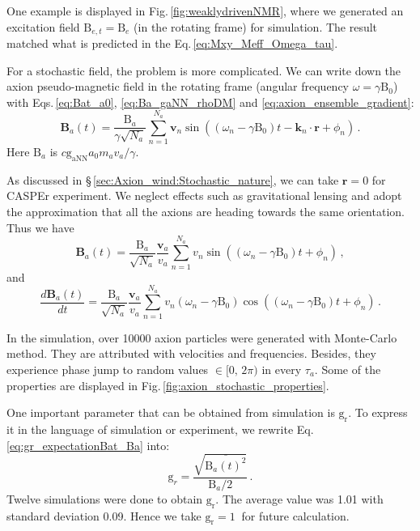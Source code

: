 One example is displayed in Fig.\,\ref{fig:weaklydrivenNMR}, where we generated an excitation field $\mathrm{B}_{e,t} = \mathrm{B}_{e}$ (in the rotating frame) for simulation. The result matched what is predicted in the Eq.\,\eqref{eq:Mxy_Meff_Omega_tau}. 

For a stochastic field, the problem is more complicated. 
We can write down the axion pseudo-magnetic field in the rotating frame (angular frequency $\omega = \gamma \mathrm{B}_0$) with Eqs.\,\eqref{eq:Bat_a0}, \eqref{eq:Ba_gaNN_rhoDM} and \eqref{eq:axion_ensemble_gradient}:
\begin{equation}
    \mathbf{B}_{a}(t) =  \dfrac{ \mathrm{B}_a}{\gamma \sqrt{N_a} }\sum_{n=1}^{N_a} \mathbf{v}_n \sin((\omega_n-\gamma \mathrm{B}_0) t - \mathbf{k}_n\cdot \mathbf{r} + \phi_n)\,. %
\end{equation}
Here $\mathrm{B}_a$ is $c \mathrm{g_{aNN}} a_0 m_a v_a / \gamma$. 

As discussed in \S\,\ref{sec:Axion_wind:Stochastic_nature}, we can take $\mathbf{r} = 0$ for CASPEr experiment. We neglect effects such as gravitational lensing and adopt the approximation that all the axions are heading towards the same orientation. Thus we have
\begin{equation}
    \mathbf{B}_{a}(t) =  \dfrac{ \mathrm{B}_a }{\sqrt{N_a} } \dfrac{\mathbf{v}_a}{v_a} 
    \sum_{n=1}^{N_a}  v_n \sin((\omega_n-\gamma \mathrm{B}_0) t +\phi_n)
    \,,%
\end{equation}
and
\begin{equation}
    \dfrac{d \mathbf{B}_{a}(t)}{dt} =  \dfrac{ \mathrm{B}_a }{\sqrt{N_a} } \dfrac{\mathbf{v}_a}{v_a}
    \sum_{n=1}^{N_a}  v_n (\omega_n-\gamma \mathrm{B}_0)\cos((\omega_n-\gamma \mathrm{B}_0) t + \phi_n)
    \,. %
\end{equation}

In the simulation, over \SI{10 000}{} axion particles were generated with Monte-Carlo method. They are attributed with velocities and frequencies. Besides, they experience phase jump to random values $\in [0,\,2\pi)$ in every $\tau_a$. Some of the properties are displayed in Fig.\,\ref{fig:axion_stochastic_properties}. 

One important parameter that can be obtained from simulation is $\mathrm{g_{r}}$. To express it in the language of simulation or experiment, we rewrite Eq.\,\eqref{eq:gr_expectationBat_Ba} into:
\begin{equation}
    \mathrm{g}_{r} = \dfrac{\sqrt{  \overline{\mathrm{B}_{a}(t)^2}  }}{\mathrm{B}_{a}/2}\,.\label{eq:gr_avgpowerBat_Ba}
\end{equation}
Twelve simulations were done to obtain $\mathrm{g_{r}}$. The average value was \SI{1.01}{} with standard deviation \SI{0.09}{}. Hence we take $\mathrm{g_{r}} = \SI{1}{}$ for future calculation. 

